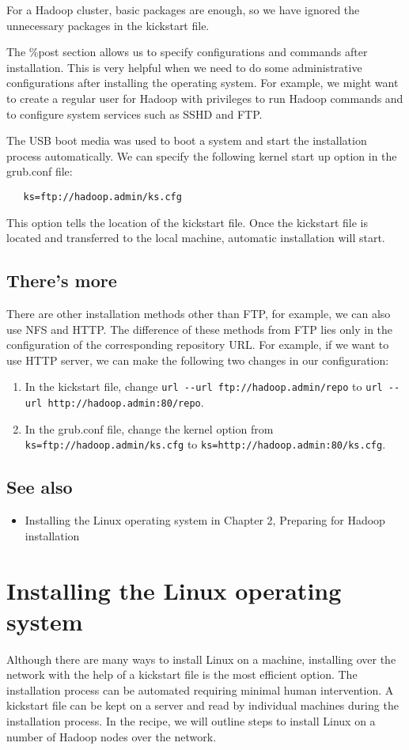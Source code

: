 For a Hadoop cluster, basic packages are enough, so we have ignored the unnecessary packages in the kickstart file.

The \%post section allows us to specify configurations and commands after installation. This is very helpful when we need to do some administrative configurations after installing the operating system. For example, we might want to create a regular user for Hadoop with privileges to run Hadoop commands and to configure system services such as SSHD and FTP.

The USB boot media was used to boot a system and start the installation process automatically. We can specify the following kernel start up option in the grub.conf file:
\begin{verbatim}
   ks=ftp://hadoop.admin/ks.cfg
\end{verbatim}
This option tells the location of the kickstart file. Once the kickstart file is located and transferred to the local machine, automatic installation will start.
\subsection*{There's more}
There are other installation methods other than FTP, for example, we can also use NFS and HTTP. The difference of these methods from FTP lies only in the configuration of the corresponding repository URL. For example, if we want to use HTTP server, we can make the following two changes in our configuration:
\begin{enumerate}
  \item In the kickstart file, change \verb|url --url ftp://hadoop.admin/repo| to \verb|url --url http://hadoop.admin:80/repo|.
  \item In the grub.conf file, change the kernel option from \verb|ks=ftp://hadoop.admin/ks.cfg| to \verb|ks=http://hadoop.admin:80/ks.cfg|.
\end{enumerate}
\subsection*{See also}
\begin{itemize}
  \item Installing the Linux operating system in Chapter 2, Preparing for Hadoop installation
\end{itemize}
\section{Installing the Linux operating system}
Although there are many ways to install Linux on a machine, installing over the network with the help of a kickstart file is the most efficient option. The installation process can be automated requiring minimal human intervention. A kickstart file can be kept on a server and read by individual machines during the installation process. In the recipe, we will outline steps to install Linux on a number of Hadoop nodes over the network.
